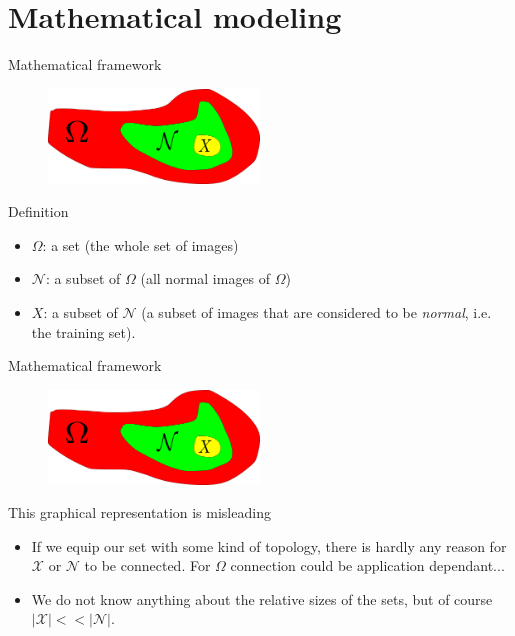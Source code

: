 \documentclass[xcolor=pdftex,dvipsnames,table,mathserif]{beamer}
\begin{document}
\section{Mathematical modeling}

\begin{frame}{Mathematical framework}

\begin{figure}[ht]
  \centering
  \includegraphics[width=0.5\textwidth]{sets}
\end{figure}


  \begin{block}{Definition}
\begin{itemize}
  \item $\Omega$: a set (the whole set of images)
  \item $\mathcal{N}$: a subset of $\Omega$ (all normal images of $\Omega$)
  \item $X$: a subset of $\mathcal{N}$ (a subset of images that are considered to be \emph{normal}, i.e. the \alert{training set}).
\end{itemize}
  \end{block}

\end{frame}


\begin{frame}{Mathematical framework}

\begin{figure}[ht]
  \centering
  \includegraphics[width=0.5\textwidth]{sets}
\end{figure}


\begin{alertblock}{This graphical representation is misleading}

\begin{itemize}
\item If we equip our set with some kind of topology, there is hardly any reason for $\mathcal{X}$ or $\mathcal{N}$ to be connected. For $\Omega$ connection could be application dependant...
\item We do not know anything about the relative sizes of the sets, but of course $|\mathcal{X}| << |\mathcal{N}|$.
\end{itemize}

\end{alertblock}

\end{frame}
\end{document}
